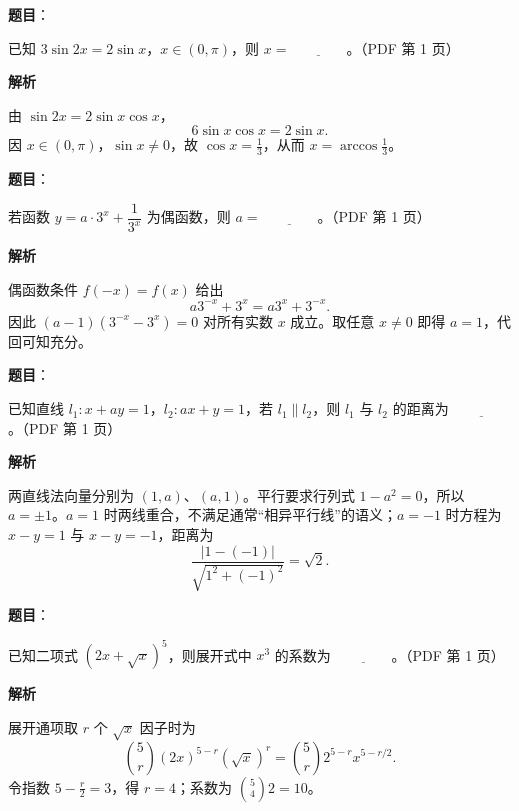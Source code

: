 \begin{answer}

\textbf{题目}：

已知 $3\sin 2x=2\sin x$，$x\in(0,\pi)$，则 $x=\underline{\qquad\qquad}$。（PDF 第 1 页）

\textbf{解析}

由 $\sin2x=2\sin x\cos x$，
\nopagebreak[4]
\[
6\sin x\cos x=2\sin x.
\]
因 $x\in(0,\pi)$，$\sin x\ne0$，故 $\cos x=\frac13$，从而 $x=\arccos\frac13$。


\end{answer}
\begin{answer}

\textbf{题目}：

若函数 $y=a\cdot 3^x+\dfrac1{3^x}$ 为偶函数，则 $a=\underline{\qquad\qquad}$。（PDF 第 1 页）

\textbf{解析}

偶函数条件 $f(-x)=f(x)$ 给出
\nopagebreak[4]
\[
a3^{-x}+3^x=a3^x+3^{-x}.
\]
因此 $(a-1)(3^{-x}-3^x)=0$ 对所有实数 $x$ 成立。取任意 $x\ne0$ 即得 $a=1$，代回可知充分。


\end{answer}
\begin{answer}

\textbf{题目}：

已知直线 $l_1\colon x+ay=1$，$l_2\colon ax+y=1$，若 $l_1\parallel l_2$，则 $l_1$ 与 $l_2$ 的距离为 $\underline{\qquad\qquad}$。（PDF 第 1 页）

\textbf{解析}

两直线法向量分别为 $(1,a)$、$(a,1)$。平行要求行列式 $1-a^2=0$，所以 $a=\pm1$。$a=1$ 时两线重合，不满足通常“相异平行线”的语义；$a=-1$ 时方程为 $x-y=1$ 与 $x-y=-1$，距离为
\nopagebreak[4]
\[
\frac{|1-(-1)|}{\sqrt{1^2+(-1)^2}}=\sqrt2.
\]


\end{answer}
\begin{answer}

\textbf{题目}：

已知二项式 $(2x+\sqrt{x})^5$，则展开式中 $x^3$ 的系数为 $\underline{\qquad\qquad}$。（PDF 第 1 页）

\textbf{解析}

展开通项取 $r$ 个 $\sqrt{x}$ 因子时为
\nopagebreak[4]
\[
\binom5r(2x)^{5-r}(\sqrt{x})^r
=\binom5r2^{5-r}x^{5-r/2}.
\]
令指数 $5-\frac r2=3$，得 $r=4$；系数为 $\binom54 2=10$。


\end{answer}
